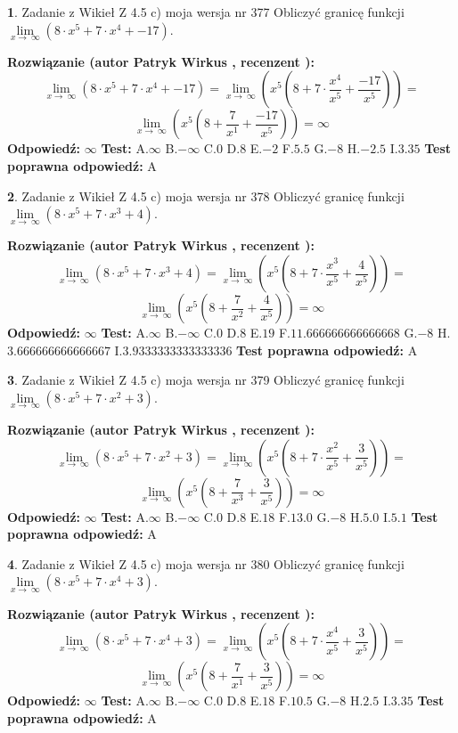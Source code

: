\documentclass[12pt, a4paper]{article}
\theoremstyle{definition} %
\newtheorem{zad}{}
\newcommand{\zadStart}[1]{\begin{zad}#1\newline}
\newcommand{\zadStop}{\end{zad}}
\newcommand{\rozwStart}[2]{\noindent \textbf{Rozwiązanie (autor #1 , recenzent #2): }\newline}
\newcommand{\rozwStop}{\newline}
\newcommand{\odpStart}{\noindent \textbf{Odpowiedź:}\newline}
\newcommand{\odpStop}{\newline}
\newcommand{\testStart}{\noindent \textbf{Test:}\newline}
\newcommand{\testStop}{\newline}
\newcommand{\kluczStart}{\noindent \textbf{Test poprawna odpowiedź:}\newline}
\newcommand{\kluczStop}{\newline}
\begin{document}
\zadStart{Zadanie z Wikieł Z 4.5 c) moja wersja nr 377}
Obliczyć granicę funkcji  $\lim\limits_{x\to\ \infty}(8 \cdot x^{5}+7 \cdot x^{4}+-17)$.
\zadStop
\rozwStart{Patryk Wirkus}{}
$$\lim\limits_{x\to\ \infty}(8 \cdot x^{5}+7 \cdot x^{4}+-17) = \lim\limits_{x\to\ \infty}(x^{5}(8 +7 \cdot \frac{x^{4}}{x^{5}}+\frac{-17}{x^{5}})) =$$ $$\lim\limits_{x\to\ \infty}(x^{5}(8 +\frac{7}{x^{1}}+\frac{-17}{x^{5}})) =\infty$$
\rozwStop
\odpStart
$\infty$
\odpStop
\testStart
A.$\infty$ B.$-\infty$ C.$0$ D.$8$ E.$-2$
F.$5.5$ G.$-8$
H.$-2.5$
I.$3.35$
\testStop
\kluczStart
A
\kluczStop



\zadStart{Zadanie z Wikieł Z 4.5 c) moja wersja nr 378}
Obliczyć granicę funkcji  $\lim\limits_{x\to\ \infty}(8 \cdot x^{5}+7 \cdot x^{3}+4)$.
\zadStop
\rozwStart{Patryk Wirkus}{}
$$\lim\limits_{x\to\ \infty}(8 \cdot x^{5}+7 \cdot x^{3}+4) = \lim\limits_{x\to\ \infty}(x^{5}(8 +7 \cdot \frac{x^{3}}{x^{5}}+\frac{4}{x^{5}})) =$$ $$\lim\limits_{x\to\ \infty}(x^{5}(8 +\frac{7}{x^{2}}+\frac{4}{x^{5}})) =\infty$$
\rozwStop
\odpStart
$\infty$
\odpStop
\testStart
A.$\infty$ B.$-\infty$ C.$0$ D.$8$ E.$19$
F.$11.666666666666668$ G.$-8$
H.$3.666666666666667$
I.$3.9333333333333336$
\testStop
\kluczStart
A
\kluczStop



\zadStart{Zadanie z Wikieł Z 4.5 c) moja wersja nr 379}
Obliczyć granicę funkcji  $\lim\limits_{x\to\ \infty}(8 \cdot x^{5}+7 \cdot x^{2}+3)$.
\zadStop
\rozwStart{Patryk Wirkus}{}
$$\lim\limits_{x\to\ \infty}(8 \cdot x^{5}+7 \cdot x^{2}+3) = \lim\limits_{x\to\ \infty}(x^{5}(8 +7 \cdot \frac{x^{2}}{x^{5}}+\frac{3}{x^{5}})) =$$ $$\lim\limits_{x\to\ \infty}(x^{5}(8 +\frac{7}{x^{3}}+\frac{3}{x^{5}})) =\infty$$
\rozwStop
\odpStart
$\infty$
\odpStop
\testStart
A.$\infty$ B.$-\infty$ C.$0$ D.$8$ E.$18$
F.$13.0$ G.$-8$
H.$5.0$
I.$5.1$
\testStop
\kluczStart
A
\kluczStop



\zadStart{Zadanie z Wikieł Z 4.5 c) moja wersja nr 380}
Obliczyć granicę funkcji  $\lim\limits_{x\to\ \infty}(8 \cdot x^{5}+7 \cdot x^{4}+3)$.
\zadStop
\rozwStart{Patryk Wirkus}{}
$$\lim\limits_{x\to\ \infty}(8 \cdot x^{5}+7 \cdot x^{4}+3) = \lim\limits_{x\to\ \infty}(x^{5}(8 +7 \cdot \frac{x^{4}}{x^{5}}+\frac{3}{x^{5}})) =$$ $$\lim\limits_{x\to\ \infty}(x^{5}(8 +\frac{7}{x^{1}}+\frac{3}{x^{5}})) =\infty$$
\rozwStop
\odpStart
$\infty$
\odpStop
\testStart
A.$\infty$ B.$-\infty$ C.$0$ D.$8$ E.$18$
F.$10.5$ G.$-8$
H.$2.5$
I.$3.35$
\testStop
\kluczStart
A
\kluczStop
\end{document}
